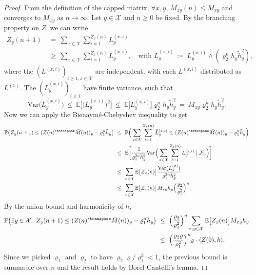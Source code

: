 \begin{refsegment}
\begin{proof}
  From the definition of the capped matrix, $\forall x,y$, $\bar{M}_{xy}(n)\leq M_{xy}$ and converges to $M_{xy}$ as $n\to\infty$.
  Let $y\in\mathcal{X}$ and $n\geq 0$ be fixed.
  By the branching property on $Z$, we can write
   \begin{align*}
    Z_{y}(n+1)\ &=\ \sum_{x\in\mathcal{X}}\sum_{i=1}^{Z_x(n)}L^{(x,i)}_y\\
&\geq\ \sum_{x\in\mathcal{X}}\sum_{i=1}^{Z_x(n)}\bar{L}^{(x,i)}_y, \quad \text{with }\bar{L}^{(x,i)}_y\ \coloneqq\ L^{(x,i)}_y \wedge (\varrho_2^n h_y\tilde{h}^2_y),
   \end{align*}
where the $(L^{(x,i)})_{i\geq 1,x\in \mathcal{X}}$ are independent, with each $L^{(x,i)}$ distributed as $L^{(x)}$. The $(\bar{L}^{(x,i)}_y)_{i\geq 1}$ have finite variance, such that 
\[
\mathrm{Var}\big(\bar{L}^{(x,i)}_y\big)\ \leq\ \mathbb{E}\big[\big(\bar{L}^{(x,i)}_y\big)^2\big]\ \leq\ \mathbb{E}\big[L^{(x,i)}_y\big]\varrho_2^n h_y\tilde{h}^2_y\ =\ M_{xy}\varrho_2^n h_y\tilde{h}^2_y.
\]
Now we can apply the Bienaymé-Chebyshev inequality to get
\begin{align}\nonumber
  \mathbb{P}\big(Z_y(n+1)\leq (Z(n)^\transpose \bar{M}(n))_y - \varrho_1^n\tilde{h}_y\big)
 \ & \leq\ \mathbb{P}\Big(\sum_{x\in\mathcal{X}}\sum_{i=1}^{Z_x(n)}\bar{L}^{(x,i)}_y\leq (Z(n)^\transpose \bar{M}(n))_y - \varrho_1^n\tilde{h}_y\Big) \\\nonumber
  &\leq\ \mathbb{E}\bigg[ \frac{1}{\varrho_1^{2n}\tilde{h}_y^2} \mathrm{Var}\Big(\sum_{x\in\mathcal{X}}\sum_{i=1}^{Z_x(n)}\bar{L}^{(x,i)}_y \;\big|\; \mathcal{F}_n \Big) \bigg]\\ \label{eq:lemma17_1}
  &\leq\ \sum_{x\in\mathcal{X} }\mathbb{E}\big[Z_x(n)\big]\frac{\mathrm{Var}(\bar{L}^{(x)}_y)}{\varrho_1^{2n}\tilde{h}^2_y}\\\nonumber
  &\leq\ \sum_{x\in\mathcal{X} }\mathbb{E}\big[Z_x(n)\big]M_{xy}h_y\Big(\frac{\varrho_2}{\varrho_1^2}\Big)^n.
\end{align}
By the union bound and harmonicity of $h$,
\begin{align*}
    \mathbb{P}\big(\exists y\in \mathcal{X},\ Z_y(n+1)\leq (Z(n)^\transpose \bar{M}(n))_y - \varrho_1^n\tilde{h}_y\big)\ &\leq\ \Big(\frac{\varrho_2}{\varrho_1^2}\Big)^n\sum_{x,y\in \mathcal{X}}\mathbb{E}\big[Z_x(n)\big]M_{xy}h_y\\
    &\leq\ \Big(\frac{\varrho_2\varrho}{\varrho_1^2}\Big)^n \varrho \cdot \langle Z(0), h\rangle.
\end{align*}
Since we picked $\varrho_1$ and $\varrho_2$ to have $\varrho_2\varrho/\varrho_1^2<1$, the previous bound is summable over $n$ and the result holds by Borel-Cantelli's lemma.
\end{proof}



\end{refsegment}
